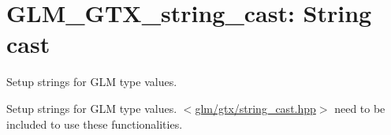 \hypertarget{group__gtx__string__cast}{\section{\-G\-L\-M\-\_\-\-G\-T\-X\-\_\-string\-\_\-cast\-: \-String cast}
\label{group__gtx__string__cast}
}


\-Setup strings for \-G\-L\-M type values.  


\-Setup strings for \-G\-L\-M type values. $<$\hyperlink{string__cast_8hpp}{glm/gtx/string\-\_\-cast.\-hpp}$>$ need to be included to use these functionalities. 